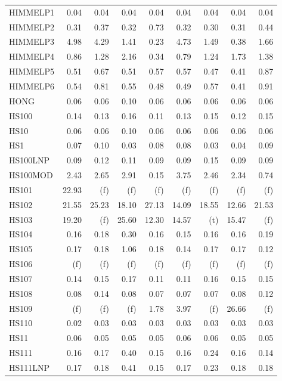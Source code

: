 \documentclass[11pt,twoside]{article}
\begin{document}
{\begin{longtable}[c]{|l|r|r|r|r|r|r|r|r|}
HIMMELP1 & 0.04 & 0.04 & 0.04 & 0.04 & 0.04 & 0.04 & 0.04 & 0.04 \\
HIMMELP2 & 0.31 & 0.37 & 0.32 & 0.73 & 0.32 & 0.30 & 0.31 & 0.44 \\
HIMMELP3 & 4.98 & 4.29 & 1.41 & 0.23 & 4.73 & 1.49 & 0.38 & 1.66 \\
HIMMELP4 & 0.86 & 1.28 & 2.16 & 0.34 & 0.79 & 1.24 & 1.73 & 1.38 \\
HIMMELP5 & 0.51 & 0.67 & 0.51 & 0.57 & 0.57 & 0.47 & 0.41 & 0.87 \\
HIMMELP6 & 0.54 & 0.81 & 0.55 & 0.48 & 0.49 & 0.57 & 0.41 & 0.91 \\
HONG & 0.06 & 0.06 & 0.10 & 0.06 & 0.06 & 0.06 & 0.06 & 0.06 \\
HS100 & 0.14 & 0.13 & 0.16 & 0.11 & 0.13 & 0.15 & 0.12 & 0.15 \\
HS10 & 0.06 & 0.06 & 0.10 & 0.06 & 0.06 & 0.06 & 0.06 & 0.06 \\
HS1 & 0.07 & 0.10 & 0.03 & 0.08 & 0.08 & 0.03 & 0.04 & 0.09 \\
HS100LNP & 0.09 & 0.12 & 0.11 & 0.09 & 0.09 & 0.15 & 0.09 & 0.09 \\
HS100MOD & 2.43 & 2.65 & 2.91 & 0.15 & 3.75 & 2.46 & 2.34 & 0.74 \\
HS101 & 22.93 & (f) & (f) & (f) & (f) & (f) & (f) & (f) \\
HS102 & 21.55 & 25.23 & 18.10 & 27.13 & 14.09 & 18.55 & 12.66 & 21.53 \\
HS103 & 19.20 & (f) & 25.60 & 12.30 & 14.57 & (t) & 15.47 & (f) \\
HS104 & 0.16 & 0.18 & 0.30 & 0.16 & 0.15 & 0.16 & 0.16 & 0.19 \\
HS105 & 0.17 & 0.18 & 1.06 & 0.18 & 0.14 & 0.17 & 0.17 & 0.12 \\
HS106 & (f) & (f) & (f) & (f) & (f) & (f) & (f) & (f) \\
HS107 & 0.14 & 0.15 & 0.17 & 0.11 & 0.11 & 0.16 & 0.15 & 0.15 \\
HS108 & 0.08 & 0.14 & 0.08 & 0.07 & 0.07 & 0.07 & 0.08 & 0.12 \\
HS109 & (f) & (f) & (f) & 1.78 & 3.97 & (f) & 26.66 & (f) \\
HS110 & 0.02 & 0.03 & 0.03 & 0.03 & 0.03 & 0.03 & 0.03 & 0.03 \\
HS11 & 0.06 & 0.05 & 0.05 & 0.05 & 0.06 & 0.06 & 0.05 & 0.05 \\
HS111 & 0.16 & 0.17 & 0.40 & 0.15 & 0.16 & 0.24 & 0.16 & 0.14 \\
HS111LNP & 0.17 & 0.18 & 0.41 & 0.15 & 0.17 & 0.23 & 0.18 & 0.18 \\

\end{longtable}}
\end{document}
